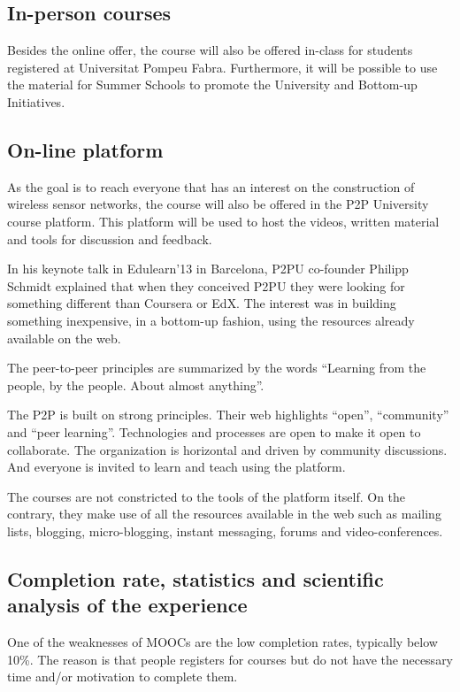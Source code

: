 \documentclass[a4paper,oneside]{book}   %
\begin{document}
\subsection{In-person courses}

Besides the online offer, the course will also be offered in-class for students registered at Universitat Pompeu Fabra.
Furthermore, it will be possible to use the material for Summer Schools to promote the University and Bottom-up Initiatives.

\subsection{On-line platform}

As the goal is to reach everyone that has an interest on the construction of wireless sensor networks, the course will also be offered in the P2P University course platform.
This platform will be used to host the videos, written material and tools for discussion and feedback.

In his keynote talk in Edulearn'13 in Barcelona, P2PU co-founder Philipp Schmidt explained that when they conceived P2PU they were looking for something different than Coursera or EdX.
The interest was in building something inexpensive, in a bottom-up fashion, using the resources already available on the web.

The peer-to-peer principles are summarized by the words ``Learning from the people, by the people. About almost anything''.

The P2P is built on strong principles. 
Their web highlights ``open'', ``community'' and ``peer learning''.
Technologies and processes are open to make it open to collaborate.
The organization is horizontal and driven by community discussions.
And everyone is invited to learn and teach using the platform.

The courses are not constricted to the tools of the platform itself. 
On the contrary, they make use of all the resources available in the web such as mailing lists, blogging, micro-blogging, instant messaging, forums and video-conferences. 

\subsection{Completion rate, statistics and scientific analysis of the experience}

One of the weaknesses of MOOCs are the low completion rates, typically below 10\%.
The reason is that people registers for courses but do not have the necessary time and/or motivation to complete them.
\end{document}
